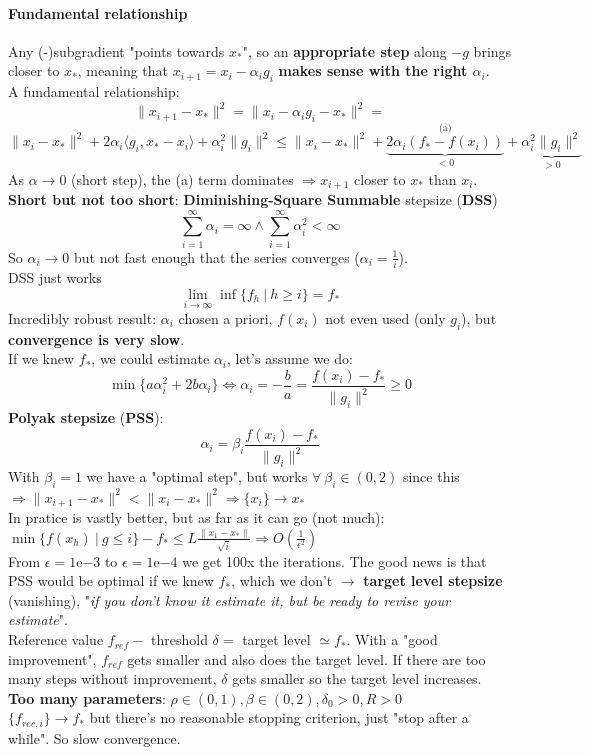 \documentclass[10pt]{report}
\begin{document}
\paragraph{Fundamental relationship} Any (-)subgradient "points towards $x_*$", so an \textbf{appropriate step} along $-g$ brings closer to $x_*$, meaning that $x_{i+1} = x_i - \alpha_ig_i$ \textbf{makes sense with the right $\alpha_i$}.\\
A fundamental relationship: $$\|x_{i+1}-x_*\|^2 = \|x_i - \alpha_ig_i - x_*\|^2 =$$
$$\|x_i-x_*\|^2+2\alpha_i\langle g_i, x_*-x_i\rangle + \alpha_i^2\|g_i\|^2 \leq \|x_i - x_*\|^2 + \overset{\text{(a)}}{\underset{<0}{\underbrace{2\alpha_i(f_*-f(x_i))}}} + \underset{>0}{\underbrace{\alpha_i^2\|g_i\|^2}} $$
As $\alpha \rightarrow 0$ (short step), the (a) term dominates $\Rightarrow x_{i+1}$ closer to $x_*$ than $x_i$.\\
\textbf{Short but not too short}: \textbf{Diminishing-Square Summable} stepsize (\textbf{DSS}) $$\sum_{i=1}^\infty\alpha_i = \infty\wedge\sum_{i=1}^\infty\alpha_i^2<\infty$$
So $\alpha_i\rightarrow 0$ but not fast enough that the series converges ($\alpha_i = \frac{1}{i}$).\\
DSS just works $$\lim_{i\to\infty} \inf\{f_h\:|\:h\geq i\} = f_*$$
Incredibly robust result: $\alpha_i$ chosen a priori, $f(x_i)$ not even used (only $g_i$), but \textbf{convergence is very slow}.\\
If we knew $f_*$, we could estimate $\alpha_i$, let's assume we do: $$\min\{a\alpha_i^2+2b\alpha_i\}\Leftrightarrow \alpha_i = -\frac{b}{a} = \frac{f(x_i)-f_*}{\|g_i\|^2} \geq 0$$
\textbf{Polyak stepsize} (\textbf{PSS}): $$\alpha_i = \beta_i\frac{f(x_i)-f_*}{\|g_i\|^2}$$ With $\beta_i = 1$ we have a "optimal step", but works $\forall\:\beta_i\in(0,2)$ since this $\Rightarrow \|x_{i+1}-x_*\|^2 < \|x_i-x_*\|^2\Rightarrow \{x_i\}\rightarrow x_*$\\
In pratice is vastly better, but as far as it can go (not much): $\min\{f(x_h)\:|\:g\leq i\}-f_*\leq L\frac{\|x_1-x_*\|}{\sqrt{i}}\Rightarrow O\left(\frac{1}{\epsilon^2}\right)$\\
From $\epsilon=1$e$-3$ to $\epsilon=1$e$-4$ we get 100x the iterations. The good news is that PSS would be optimal if we knew $f_*$, which we don't $\rightarrow$ \textbf{target level stepsize} (vanishing), "\textit{if you don't know it estimate it, but be ready to revise your estimate}".\\
Reference value $f_{ref} -$ threshold $\delta =$ target level $\simeq f_*$. With a "good improvement", $f_{ref}$ gets smaller and also does the target level. If there are too many steps without improvement, $\delta$ gets smaller so the target level increases.\\
\textbf{Too many parameters}: $\rho\in(0,1),\beta\in(0,2),\delta_0>0,R>0$\\
$\{f_{rec,i}\}\rightarrow f_*$ but there's no reasonable stopping criterion, just "stop after a while". So slow convergence.
\end{document}
